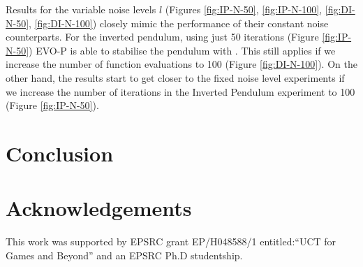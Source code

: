 \documentclass[conference]{IEEEtran}
\begin{document}
Results for the variable noise levels $l$ (Figures \ref{fig:IP-N-50}, \ref{fig:IP-N-100}, \ref{fig:DI-N-50}, \ref{fig:DI-N-100}) closely mimic the performance of their constant noise counterparts. For the inverted pendulum, using just 50 iterations (Figure \ref{fig:IP-N-50}) EVO-P is able to stabilise the pendulum with . This still applies if we increase the number of function evaluations to 100 (Figure \ref{fig:DI-N-100}). On the other hand, the results start to get closer to the fixed noise level experiments if we increase the number of iterations in the Inverted Pendulum experiment to 100 (Figure \ref{fig:IP-N-50}).




\section{Conclusion} \label{sec:conclusion}

 
\section*{Acknowledgements}
This work was supported by EPSRC grant EP/H048588/1 entitled:``UCT for Games and Beyond'' and an EPSRC Ph.D studentship. 





\end{document}
